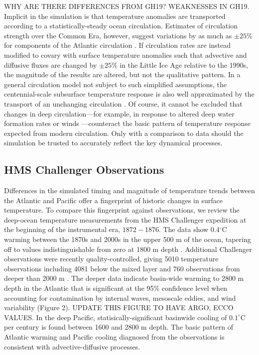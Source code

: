 \documentclass[authoryear,round,12pt]{article}
\begin{document}
WHY ARE THERE DIFFERENCES FROM GH19?
WEAKNESSES IN GH19. Implicit in the \citet{Gebbie-Huybers-2019:Little}
simulation is that temperature anomalies are transported according to
a statistically-steady ocean circulation. Estimates of circulation
strength over the Common Era, however, suggest variations by as much
as $\pm 25\%$ for components of the Atlantic circulation
\citep{Lund-Lynch-Stiegl-2006:Gulf,Rahmstorf-Box-2015:Exceptional}. If
circulation rates are instead modified to covary with surface
temperature anomalies such that advective and diffusive fluxes are
changed by $\pm25\%$ in the Little Ice Age relative to the 1990s, the
magnitude of the results are altered, but not the qualitative
pattern. In a general circulation model not subject to such simplified
assumptions, the centennial-scale subsurface temperature response is
also well approximated by the transport of an unchanging circulation
\citep{Marshall-Scott-2015:oceans}. Of course, it cannot be excluded
that changes in deep circulation---for example, in response to altered
deep water formation rates or winds
\citep{Kawase--1987:Establishment}---counteract the basic pattern of
temperature response expected from modern circulation. Only with a
comparison to data should the simulation be trusted to accurately
reflect the key dynamical processes.

\subsection{HMS Challenger Observations}
\label{sec:observations}

Differences in the simulated timing and magnitude of temperature
trends between the Atlantic and Pacific offer a fingerprint of
historic changes in surface temperature.  To compare this fingerprint
against observations, we review the deep-ocean temperature
measurements from the HMS Challenger expedition at the beginning of
the instrumental era, $1872-1876$. The data show 0.4$^\circ$C warming
between the 1870s and 2000s in the upper 500 m of the ocean, tapering
off to values indistinguishable from zero at 1800 m depth
\citep{Roemmich-Gould-2012:135}.  Additional Challenger observations
were recently quality-controlled, giving 5010 temperature observations
including 4081 below the mixed layer and 760 observations from deeper
than 2000 m \citep{Gebbie-Huybers-2019:Little}. The deeper data
indicate basin-wide warming to 2800 m depth in the Atlantic that is
significant at the 95\% confidence level when accounting for
contamination by internal waves, mesoscale eddies, and wind
variability (Figure 2). UPDATE THIS FIGURE TO HAVE ARGO, ECCO
VALUES. In the deep Pacific, statisically-significant basinwide
cooling of $0.1^\circ$C per century is found between 1600 and 2800 m
depth. The basic pattern of Atlantic warming and Pacific cooling
diagnosed from the observations is consistent with advective-diffusive
processes.
\end{document}
